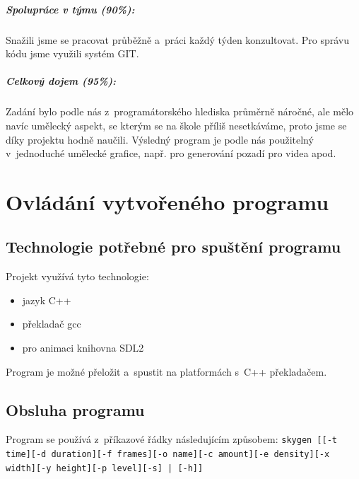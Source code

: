 \documentclass[12pt,a4paper,titlepage,final]{report}
\begin{document}
\paragraph{Spolupráce v týmu (90\%):}
Snažili jsme se pracovat průběžně a~práci každý týden konzultovat. Pro
správu kódu jsme využili systém GIT.

\paragraph{Celkový dojem (95\%):}
Zadání bylo podle nás z~programátorského hlediska průměrně náročné, ale
mělo navíc umělecký aspekt, se kterým se na škole příliš nesetkáváme,
proto jsme se díky projektu hodně naučili. Výsledný program je podle
nás použitelný v~jednoduché umělecké grafice, např. pro generování pozadí
pro videa apod.

\chapter{Ovládání vytvořeného programu}

\section{Technologie potřebné pro spuštění programu}
Projekt využívá tyto technologie:

\begin{itemize}
\item jazyk C++
\item překladač gcc
\item pro animaci knihovna SDL2
\end{itemize}

Program je možné přeložit a~spustit na platformách s~C++ překladačem.

\section{Obsluha programu}

Program se používá z~příkazové řádky následujícím způsobem:
{\tt skygen [[-t time][-d duration][-f frames][-o name][-c amount][-e density][-x width][-y height][-p level][-s] | [-h]]}
\end{document}
